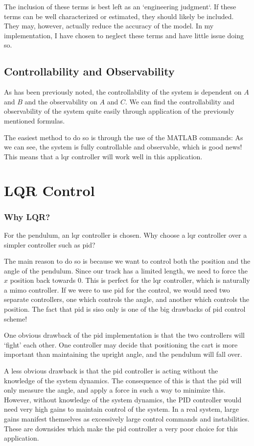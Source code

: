 The inclusion of these terms is best left as an `engineering judgment`. If these terms can be well characterized or estimated, they should likely be included. They may, however, actually reduce the accuracy of the model. In my implementation, I have chosen to neglect these terms and have little issue doing so.

\subsection{Controllability and Observability}
As has been previously noted, the controllability of the system is dependent on $A$ and $B$ and the observability on $A$ and $C$. We can find the controllability and observability of the system quite easily through application of the previously mentioned formulas.

The easiest method to do so is through the use of the MATLAB commands:
As we can see, the system is fully controllable and observable, which is good news! This means that a \gls{lqr} controller will work well in this application.

\section{LQR Control}
\subsubsection{Why LQR?}
For the pendulum, an \gls{lqr} controller is chosen. Why choose a \gls{lqr} controller over a simpler controller such as \gls{pid}?

The main reason to do so is because we want to control both the position and the angle of the pendulum. Since our track has a limited length, we need to force the $x$ position back towards 0. This is perfect for the \gls{lqr} controller, which is naturally a \gls{mimo} controller. If we were to use \gls{pid} for the control, we would need two separate controllers, one which controls the angle, and another which controls the position. The fact that \gls{pid} is \gls{siso} only is one of the big drawbacks of \gls{pid} control scheme!

One obvious drawback of the \gls{pid} implementation is that the two controllers will `fight' each other. One controller may decide that positioning the cart is more important than maintaining the upright angle, and the pendulum will fall over.

A less obvious drawback is that the \gls{pid} controller is acting without the knowledge of the system dynamics. The consequence of this is that the \gls{pid} will only measure the angle, and apply a force in such a way to minimize this. However, without knowledge of the system dynamics, the PID controller would need very high gains to maintain control of the system. In a real system, large gains manifest themselves as excessively large control commands and instabilities. These are downsides which make the \gls{pid} controller a very poor choice for this application.

